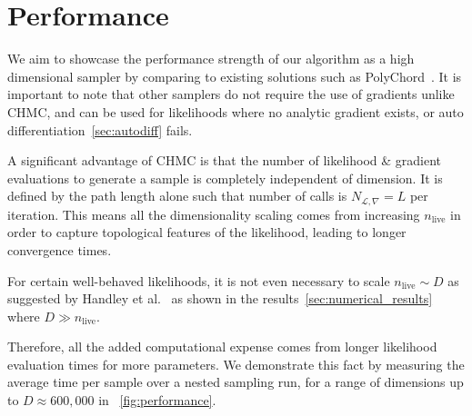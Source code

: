 \documentclass[11pt]{article}
\begin{document}
\section{Performance}\label{sec:performance}
    We aim to showcase the performance strength of our algorithm as a high dimensional sampler by comparing to existing
    solutions such as PolyChord~\cite{Handley_2015}.
    It is important to note that other samplers do not require the use of gradients unlike CHMC, and can be used for
    likelihoods where no analytic gradient exists, or auto differentiation~\eqref{sec:autodiff} fails.

    A significant advantage of CHMC is that the number of likelihood \& gradient evaluations to generate a sample is
    completely independent of dimension.
    It is defined by the path length alone such that number of calls is $N_{\mathcal{L}, \nabla} = L$ per iteration.
    This means all the dimensionality scaling comes from increasing $n_{\text{live}}$ in order to capture topological
    features of the likelihood, leading to longer convergence times.

    For certain well-behaved likelihoods, it is not even necessary to scale $n_{\text{live}} \sim D$ as suggested by
    Handley et al.~\cite{Handley_2015} as shown in the results~\eqref{sec:numerical_results} where $D \gg n_{\text{live}}$.

    Therefore, all the added computational expense comes from longer likelihood evaluation times for more parameters.
    We demonstrate this fact by measuring the average time per sample over a nested sampling run, for a range of
    dimensions up to $D \approx 600,000$ in ~\cref{fig:performance}.
\end{document}
